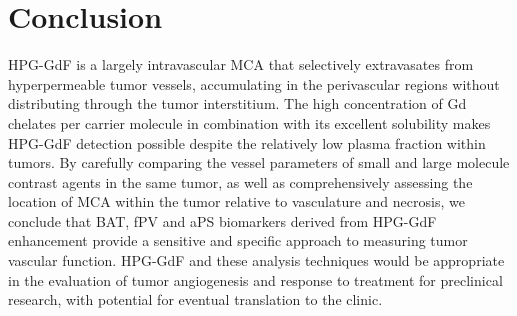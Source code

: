 \section{Conclusion}

HPG-GdF is a largely intravascular MCA that selectively extravasates from hyperpermeable tumor vessels, accumulating in the perivascular regions without distributing through the tumor interstitium.
The high concentration of Gd chelates per carrier molecule in combination with its excellent solubility makes HPG-GdF detection possible despite the relatively low plasma fraction within tumors.
By carefully comparing the vessel parameters of small and large molecule contrast agents in the same tumor, as well as comprehensively assessing the location of MCA within the tumor relative to vasculature and necrosis, we conclude that BAT, fPV and aPS biomarkers derived from HPG-GdF enhancement provide a sensitive and specific approach to measuring tumor vascular function.
HPG-GdF and these analysis techniques would be appropriate in the evaluation of tumor angiogenesis and response to treatment for preclinical research, with potential for eventual translation to the clinic.

\endinput

Any text after an \endinput is ignored.
You could put scraps here or things in progress.
